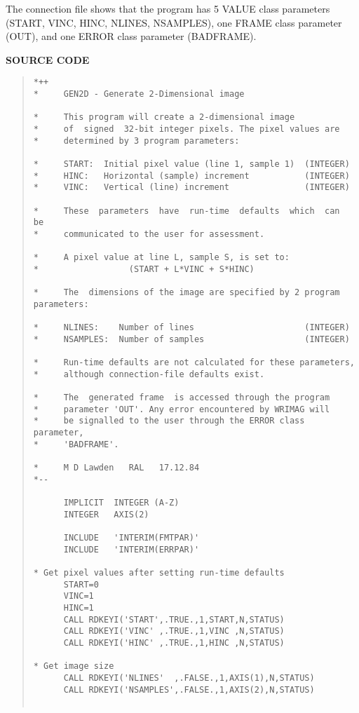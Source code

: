The connection file shows that the program has 5 VALUE class parameters
(START, VINC, HINC, NLINES, NSAMPLES), one FRAME class parameter (OUT), and one
ERROR class parameter (BADFRAME).
\vspace{5mm}
\begin{center}
{\bf SOURCE CODE}
\end{center}
\begin{quote}
\begin{verbatim}
*++
*     GEN2D - Generate 2-Dimensional image

*     This program will create a 2-dimensional image
*     of  signed  32-bit integer pixels. The pixel values are
*     determined by 3 program parameters:

*     START:  Initial pixel value (line 1, sample 1)  (INTEGER)
*     HINC:   Horizontal (sample) increment           (INTEGER)
*     VINC:   Vertical (line) increment               (INTEGER)

*     These  parameters  have  run-time  defaults  which  can  be
*     communicated to the user for assessment.

*     A pixel value at line L, sample S, is set to:
*                  (START + L*VINC + S*HINC)

*     The  dimensions of the image are specified by 2 program parameters:

*     NLINES:    Number of lines                      (INTEGER)
*     NSAMPLES:  Number of samples                    (INTEGER)

*     Run-time defaults are not calculated for these parameters,
*     although connection-file defaults exist.

*     The  generated frame  is accessed through the program
*     parameter 'OUT'. Any error encountered by WRIMAG will
*     be signalled to the user through the ERROR class parameter,
*     'BADFRAME'.

*     M D Lawden   RAL   17.12.84
*--

      IMPLICIT  INTEGER (A-Z)
      INTEGER   AXIS(2)

      INCLUDE   'INTERIM(FMTPAR)'
      INCLUDE   'INTERIM(ERRPAR)'

* Get pixel values after setting run-time defaults
      START=0
      VINC=1
      HINC=1
      CALL RDKEYI('START',.TRUE.,1,START,N,STATUS)
      CALL RDKEYI('VINC' ,.TRUE.,1,VINC ,N,STATUS)
      CALL RDKEYI('HINC' ,.TRUE.,1,HINC ,N,STATUS)

* Get image size
      CALL RDKEYI('NLINES'  ,.FALSE.,1,AXIS(1),N,STATUS)
      CALL RDKEYI('NSAMPLES',.FALSE.,1,AXIS(2),N,STATUS)


\end{verbatim}
\end{quote}
